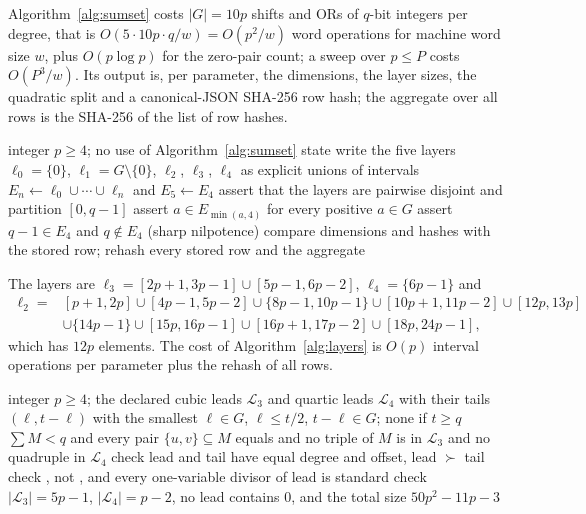 \documentclass[11pt]{article}
\theoremstyle{definition}
\theoremstyle{remark}
\begin{document}
Algorithm~\ref{alg:sumset} costs $|G|=10p$ shifts and ORs of $q$-bit integers per degree, that is
$O(5\cdot10p\cdot q/w)=O(p^2/w)$ word operations for machine word size $w$, plus $O(p\log p)$
for the zero-pair count; a sweep over $p\leq P$ costs $O(P^3/w)$. Its output is, per parameter,
the dimensions, the layer sizes, the quadratic split and a canonical-JSON SHA-256 row hash; the
aggregate over all rows is the SHA-256 of the list of row hashes.

\begin{algorithm}[ht]
\caption{Independent recomputation from the disjoint layers (computation EXP-025 audit).}
\label{alg:layers}
\begin{algorithmic}[1]
\Require integer $p\geq4$; no use of Algorithm~\ref{alg:sumset} state
\State write the five layers $\ell_0=\{0\}$, $\ell_1=G\setminus\{0\}$, $\ell_2$, $\ell_3$, $\ell_4$ as explicit unions of intervals
\State $E_n\gets\ell_0\cup\cdots\cup\ell_n$ and $E_5\gets E_4$
\State assert that the layers are pairwise disjoint and partition $[0,q-1]$
\State assert $a\in E_{\min(a,4)}$ for every positive $a\in G$
\State assert $q-1\in E_4$ and $q\notin E_4$ (sharp nilpotence)
\State compare dimensions and hashes with the stored row; rehash every stored row and the aggregate
\end{algorithmic}
\end{algorithm}

The layers are $\ell_3=[2p+1,3p-1]\cup[5p-1,6p-2]$, $\ell_4=\{6p-1\}$ and
\begin{align*}
\ell_2={}&[p+1,2p]\cup[4p-1,5p-2]\cup\{8p-1,10p-1\}\cup[10p+1,11p-2]\cup[12p,13p]\\
&\cup\{14p-1\}\cup[15p,16p-1]\cup[16p+1,17p-2]\cup[18p,24p-1],
\end{align*}
which has $12p$ elements. The cost of Algorithm~\ref{alg:layers} is $O(p)$ interval operations per parameter plus the
rehash of all rows.

\begin{algorithm}[ht]
\caption{Cached quadratic oracle and boundary-divisibility test (computation EXP-026, sweep).}
\label{alg:oracle}
\begin{algorithmic}[1]
\Require integer $p\geq4$; the declared cubic leads $\mathcal L_3$ and quartic leads $\mathcal L_4$ with their tails
 
  \State \Return $(\ell,t-\ell)$ with the smallest $\ell\in G$, $\ell\leq t/2$, $t-\ell\in G$; none if $t\geq q$
\EndFunction
{}
  \State \Return $\sum M<q$ and every pair $\{u,v\}\subseteq M$ equals  and no triple of $M$ is in $\mathcal L_3$ and no quadruple in $\mathcal L_4$
\EndFunction
{}
  \State check lead and tail have equal degree and offset, lead $\succ$ tail
  \State check , not , and every one-variable divisor of lead is standard
\EndFor
\State check $|\mathcal L_3|=5p-1$, $|\mathcal L_4|=p-2$, no lead contains $0$, and the total size $50p^2-11p-3$
\end{algorithmic}
\end{algorithm}
\end{document}
